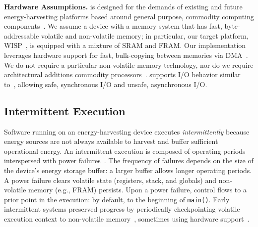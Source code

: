 \textbf{Hardware Assumptions.} \sys is designed for the demands of existing and future energy-harvesting platforms based around general purpose, commodity computing components~\cite{wisp,msp430datasheet}. We assume a device with a memory system that has fast, byte-addressable volatile and non-volatile memory; in particular, our target platform, WISP~\cite{wisp}, is equipped with a mixture of SRAM and FRAM. Our implementation leverages hardware support for fast, bulk-copying between memories via DMA~\cite{msp430datasheet}. We do not require a particular non-volatile memory technology, nor do we require architectural additions commodity processors~\cite{su_date_2017,ratchet,quickrecall,nvp}. \sys supports I/O behavior similar to~\cite{alpaca,chain}, allowing safe, synchronous I/O and unsafe, asynchronous I/O.

\subsection{Intermittent Execution}
\label{sec:background_consistency}


%
Software running on an energy-harvesting device executes {\em intermittently} because energy sources are not always available to harvest and buffer sufficient operational energy. An intermittent execution is composed of operating periods interspersed with power failures~\cite{dino,chain,alpaca,ratchet}. The frequency of failures depends on the size of the device's energy storage buffer: a larger buffer allows longer operating periods. 
A power failure clears volatile  state (registers, stack, and globals) and non-volatile memory (e.g., FRAM) persists. Upon a power failure, control flows to a prior point in the execution: by default, to the beginning of {\tt main()}. Early intermittent systems preserved progress by periodically checkpointing volatile execution context to non-volatile memory~\cite{mementos,quickrecall}, sometimes using hardware support~\cite{mementos,mottola2017harvos,hibernusplusplus,hibernus,idetic}. 


